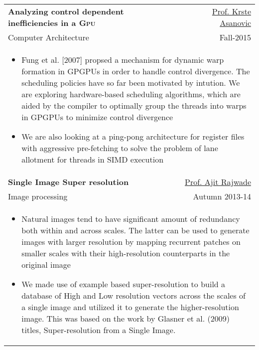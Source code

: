 \begin{tabularx}{.95\textwidth}{lr}
\textbf{Analyzing control dependent inefficiencies in a \textsc{Gpu}} &
\href{https://www.ee.iitb.ac.in/~viren/}{Prof. Krste Asanovic}\\
Computer Architecture & Fall-2015 \\
\multicolumn{2}{p{16cm}}{
\begin{itemize}
	\item Fung et al. [2007] propsed a mechanism for dynamic warp formation in GPGPUs in order to handle control divergence. The scheduling policies have so far been motivated by intution. We are exploring hardware-based scheduling algorithms, which are aided by the compiler to optimally group the threads into warps in GPGPUs to minimize control divergence   
	\item We are also looking at a ping-pong architecture for register files with aggressive pre-fetching to solve the problem of lane allotment for threads in SIMD execution
\end{itemize}
}\\

\textbf{Single Image Super resolution} & \href{https://www.cse.iitb.ac.in/~ajitvr/}{Prof. Ajit Rajwade}\\
Image processing & Autumn 2013-14\\
\multicolumn{2}{p{16cm}}{
\begin{itemize}
	\item Natural images tend to have significant amount of redundancy both within and across scales. The latter can be used to generate images with larger resolution by mapping recurrent patches on smaller scales with their high-resolution counterparts in the original image
	\item We made use of example based super-resolution to build a database of High and Low resolution vectors across the scales of a single image and utilized it to generate the higher-resolution image. This was based on the work by Glasner et al. (2009) titles, Super-resolution from a Single Image.
\end{itemize}
}\\


\end{tabularx}
